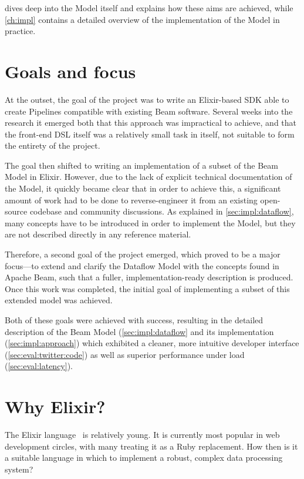  dives deep into the Model itself and explains how these aims are achieved, while \cref{ch:impl} contains a detailed overview of the implementation of the Model in practice.

\section{Goals and focus}\label{sec:intro:goals}\label{sec:intro:results}

At the outset, the goal of the project was to write an Elixir-based SDK able to create Pipelines compatible with existing Beam software.
Several weeks into the research it emerged both that this approach was impractical to achieve, and that the front-end DSL itself was a relatively small task in itself, not suitable to form the entirety of the project.

The goal then shifted to writing an implementation of a subset of the Beam Model in Elixir.
However, due to the lack of explicit technical documentation of the Model, it quickly became clear that in order to achieve this, a significant amount of work had to be done to reverse-engineer it from an existing open-source codebase and community discussions.
As explained in \cref{sec:impl:dataflow}, many concepts have to be introduced in order to implement the Model, but they are not described directly in any reference material.

Therefore, a second goal of the project emerged, which proved to be a major focus---to extend and clarify the Dataflow Model with the concepts found in Apache Beam, such that a fuller, implementation-ready description is produced.
Once this work was completed, the initial goal of implementing a subset of this extended model was achieved.

Both of these goals were achieved with success, resulting in the detailed description of the Beam Model (\cref{sec:impl:dataflow} and its implementation (\cref{sec:impl:approach}) which exhibited a cleaner, more intuitive developer interface (\cref{sec:eval:twitter:code}) as well as superior performance under load (\cref{sec:eval:latency}).

\section{Why Elixir?}\label{sec:intro:elixir}

The Elixir language~\cite{Elixir} is relatively young.
It is currently most popular in web development circles, with many treating it as a Ruby replacement.
How then is it a suitable language in which to implement a robust, complex data processing system?

